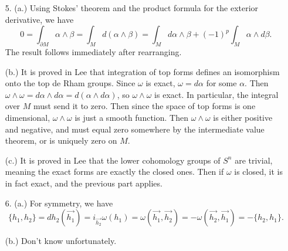 \documentclass[11pt, reqno]{article}
\theoremstyle{plain}
\theoremstyle{definition}
\theoremstyle{remark}
\begin{document}
\begin{enumerate}
    (e.) $*\alpha$ is just the volume form for $S^n$. Then its integral over $S^n$ will equal 
    the surface area of the $n$-sphere. This proves $*\alpha$ is not exact by the reasoning above.

    \item[5.] (a.) Using Stokes' theorem and the product formula for the exterior derivative, we have
    \[
        0 = \int_{\partial M}\alpha \wedge \beta = \int_{M} d(\alpha \wedge \beta) = \int_M d\alpha \wedge \beta
        + (-1)^p\int_M \alpha \wedge d\beta.
    \]
    The result follows immediately after rearranging.

    (b.) It is proved in Lee that integration of top forms defines an isomorphism onto the top de Rham groups. 
    Since $\omega$ is exact, $\omega = d\alpha$ for some $\alpha$. Then $\omega \wedge \omega = d\alpha \wedge d\alpha
    = d(\alpha \wedge d\alpha)$, so $\omega \wedge \omega$ is exact. In particular, the integral over $M$
    must send it to zero. Then since the space of top forms is one dimensional, $\omega \wedge \omega$ is just 
    a smooth function. Then $\omega \wedge\omega$ is either positive and negative, and must equal zero somewhere
    by the intermediate value theorem, or is uniquely zero on $M$. 

    (c.) It is proved in Lee that the lower cohomology groups of $S^n$ are trivial, meaning the exact forms 
    are exactly the closed ones. Then if $\omega$ is closed, it is in fact exact, and the previous part applies.

    \item[6.] (a.) For symmetry, we have
    \[
        \{h_1, h_2\} = dh_2(\overrightarrow{h_1}) = i_{\overrightarrow{h_2}}\omega(h_1) = 
        \omega(\overrightarrow{h_1}, \overrightarrow{h_2}) = -\omega(\overrightarrow{h_2},\overrightarrow{h_1})
        = -\{h_2,h_1\}.
    \]

    (b.) Don't know unfortunately.

\end{enumerate}
\end{document}
